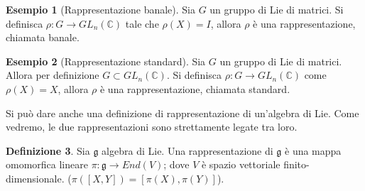 \documentclass[12pt,a4paper]{report}
\theoremstyle{definition}
\newtheorem{Def}{Definizione}[chapter]
\theoremstyle{Theorem}
\theoremstyle{definition}
\newtheorem{Ex}[Def]{Esempio}
\theoremstyle{definition}
\theoremstyle{definition}
\begin{document}
\begin{Ex}[Rappresentazione banale]
	Sia $G$ un gruppo di Lie di matrici. Si definisca $\rho: G\rightarrow GL_n(\mathbb{C})$ tale che $\rho(X)=I$, allora $\rho$ è una rappresentazione, chiamata banale. 
\end{Ex}
\begin{Ex}[Rappresentazione standard]
	Sia $G$ un gruppo di Lie di matrici. Allora per definizione $G\subset GL_n(\mathbb{C})$. Si definisca $\rho: G\rightarrow GL_n(\mathbb{C})$ come $\rho(X)=X$, allora $\rho$ è una rappresentazione, chiamata standard. 
\end{Ex}
Si può dare anche una definizione di rappresentazione di un'algebra di Lie. Come vedremo, le due rappresentazioni sono strettamente legate tra loro.
\begin{Def}
	Sia $\mathfrak{g}$ algebra di Lie. Una rappresentazione di $\mathfrak{g}$ è una mappa omomorfica lineare $\pi:\mathfrak{g}\rightarrow End(V)$; dove $V$ è spazio vettoriale finito-dimensionale. ($\pi([X,Y])=[\pi(X),\pi(Y)]$).
\end{Def}
\end{document}
